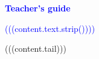 
\textcolor{blue}{{\Large\textbf{Teacher's guide}}\par
(((content.text.strip())))}
(((content.tail)))
